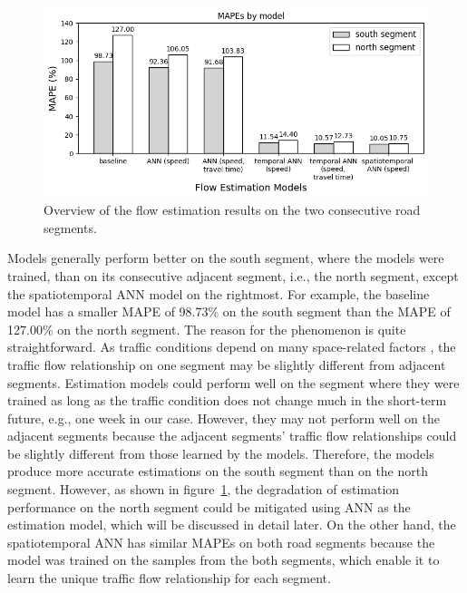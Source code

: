 \documentclass[english]{kththesis}
\begin{document}
\begin{figure}[!ht]
    \centering
    \includegraphics[width=\textwidth]{mape_histogram.png}
    \caption{Overview of the flow estimation results on the two consecutive road segments.}
    \label{fig:mape_histogram}
\end{figure}

Models generally perform better on the south segment, where the models were trained, than on its consecutive adjacent segment, i.e., the north segment, except the spatiotemporal ANN model on the rightmost. For example, the baseline model has a smaller MAPE of 98.73\% on the south segment than the MAPE of 127.00\% on the north segment. The reason for the phenomenon is quite straightforward. As traffic conditions depend on many space-related factors \cite{seo_tse, wang_tse_online_calibration}, the traffic flow relationship on one segment may be slightly different from adjacent segments. Estimation models could perform well on the segment where they were trained as long as the traffic condition does not change much in the short-term future, e.g., one week in our case. However, they may not perform well on the adjacent segments because the adjacent segments' traffic flow relationships could be slightly different from those learned by the models. Therefore, the models produce more accurate estimations on the south segment than on the north segment. However, as shown in figure~\ref{fig:mape_histogram}, the degradation of estimation performance on the north segment could be mitigated using ANN as the estimation model, which will be discussed in detail later. On the other hand, the spatiotemporal ANN has similar MAPEs on both road segments because the model was trained on the samples from the both segments, which enable it to learn the unique traffic flow relationship for each segment.
\end{document}
